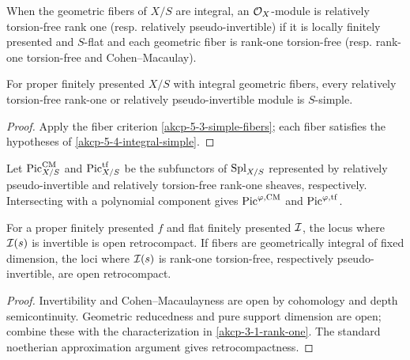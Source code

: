 \begin{definition}
\label{akcp-5-9-relative-tf}
When the geometric fibers of $X/S$ are integral, an $\mathcal O_X$-module is
relatively torsion-free rank one (resp. relatively pseudo-invertible) if it is
locally finitely presented and $S$-flat and each geometric fiber is rank-one
torsion-free (resp. rank-one torsion-free and Cohen--Macaulay).
\end{definition}

\begin{proposition}
\label{akcp-5-10-relative-simple}
For proper finitely presented $X/S$ with integral geometric fibers, every
relatively torsion-free rank-one or relatively pseudo-invertible module is
$S$-simple.
\end{proposition}
\begin{proof}
Apply the fiber criterion \cref{akcp-5-3-simple-fibers}; each fiber satisfies
the hypotheses of \cref{akcp-5-4-integral-simple}.
\end{proof}

\begin{definition}
\label{akcp-5-11-picard}
Let $\operatorname{Pic}^{\mathrm{CM}}_{X/S}$ and $\operatorname{Pic}^{\mathrm{tf}}_{X/S}$ be the subfunctors
of $\operatorname{Spl}_{X/S}$ represented by relatively pseudo-invertible and relatively
torsion-free rank-one sheaves, respectively.  Intersecting with a polynomial
component gives $\operatorname{Pic}^{\varphi,\mathrm{CM}}$ and
$\operatorname{Pic}^{\varphi,\mathrm{tf}}$.
\end{definition}

\begin{lemma}
\label{akcp-5-12-open-fiber-conditions}
For a proper finitely presented $f$ and flat finitely presented $\mathcal I$, the
locus where $\mathcal I(s)$ is invertible is open retrocompact.  If fibers are
geometrically integral of fixed dimension, the loci where $\mathcal I(s)$ is
rank-one torsion-free, respectively pseudo-invertible, are open retrocompact.
\end{lemma}
\begin{proof}
Invertibility and Cohen--Macaulayness are open by cohomology and depth
semicontinuity.  Geometric reducedness and pure support dimension are open;
combine these with the characterization in \cref{akcp-3-1-rank-one}.  The
standard noetherian approximation argument gives retrocompactness.
\end{proof}

